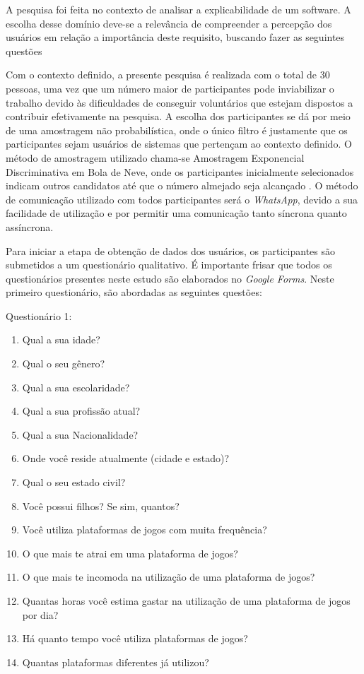 \documentclass[12pt]{article}
\begin{document}
\par A pesquisa foi feita no contexto de analisar a explicabilidade de um software. A escolha desse domínio deve-se a relevância de compreender a percepção dos usuários em relação a importância deste requisito, buscando fazer as seguintes questões

\par Com o contexto definido, a presente pesquisa é realizada com o total de 30 pessoas, uma vez que um número maior de participantes pode inviabilizar o trabalho devido às dificuldades de conseguir voluntários que estejam dispostos a contribuir efetivamente na pesquisa. A escolha dos participantes se dá por meio de uma amostragem não probabilística, onde o único filtro é justamente que os participantes sejam usuários de sistemas que pertençam ao contexto definido. O método de amostragem utilizado chama-se Amostragem Exponencial Discriminativa em Bola de Neve, onde os participantes inicialmente selecionados indicam outros candidatos até que o número almejado seja alcançado \cite{snow_ball_prob}. O método de comunicação utilizado com todos participantes será o \emph{WhatsApp}, devido a sua facilidade de utilização e por permitir uma comunicação tanto síncrona quanto assíncrona.
       
\par Para iniciar a etapa de obtenção de dados dos usuários, os participantes são submetidos a um questionário qualitativo. É importante frisar que todos os questionários presentes neste estudo são elaborados no \emph{Google Forms}. Neste primeiro questionário, são abordadas as seguintes questões:
\par Questionário 1:
\begin{enumerate}\setlength\itemsep{0.5em}
    \item Qual a sua idade?
    \item Qual o seu gênero?
    \item Qual a sua escolaridade?
    \item Qual a sua profissão atual?
    \item Qual a sua Nacionalidade?
    \item Onde você reside atualmente (cidade e estado)? 
    \item Qual o seu estado civil?
    \item Você possui filhos? Se sim, quantos?
    \item Você utiliza plataformas de jogos com muita frequência?
    \item O que mais te atrai em uma plataforma de jogos?
    \item O que mais te incomoda na utilização de uma plataforma de jogos?
    \item Quantas horas você estima gastar na utilização de uma plataforma de jogos por dia?
    \item Há quanto tempo você utiliza plataformas de jogos?
    \item Quantas plataformas diferentes já utilizou?
\end{enumerate}
       
\end{document}
